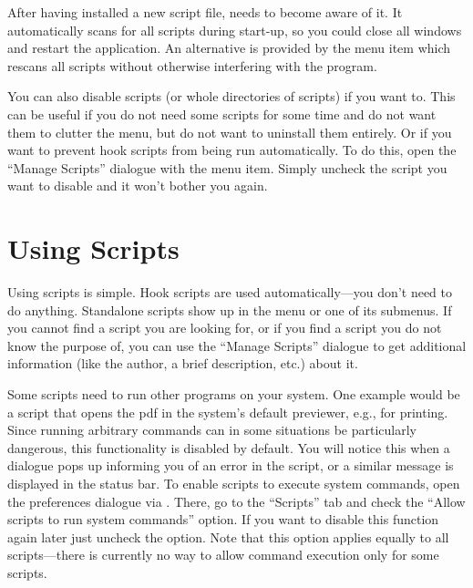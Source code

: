 After having installed a new script file, {\Tw} needs to become aware of it. It automatically scans for all scripts during start-up, so you could close all {\Tw} windows and restart the application. An alternative is provided by the \submenu{}\submenu{} menu item which rescans all scripts without otherwise interfering with the program.

You can also disable scripts (or whole directories of scripts) if you want to. This can be useful if you do not need some scripts for some time and do not want them to clutter the  menu, but do not want to uninstall them entirely. Or if you want to prevent hook scripts from being run automatically. To do this, open the ``Manage Scripts'' dialogue with the \submenu{}\submenu{} menu item. Simply uncheck the script you want to disable and it won't bother you again.

\section{Using Scripts}

Using scripts is simple. Hook scripts are used automatically---you don't need to do anything. Standalone scripts show up in the  menu or one of its submenus. If you cannot find a script you are looking for, or if you find a script you do not know the purpose of, you can use the ``Manage Scripts'' dialogue to get additional information (like the author, a brief description, etc.) about it. 

Some scripts need to run other programs on your system. One example would be a script that opens the pdf in the system's default previewer, e.g., for printing. Since running arbitrary commands can in some situations be particularly dangerous, this functionality is disabled by default. You will notice this when a dialogue pops up informing you of an error in the script, or a similar message is displayed in the status bar. To enable scripts to execute system commands, open the preferences dialogue via \submenu{}. There, go to the ``Scripts'' tab and check the ``Allow scripts to run system commands'' option. If you want to disable this function again later just uncheck the option. Note that this option applies equally to all scripts---there is currently no way to allow command execution only for some scripts.
